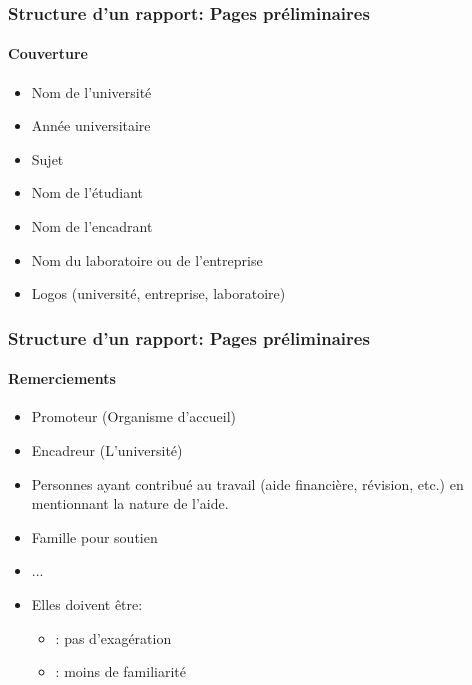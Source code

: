 \documentclass[xcolor=table]{beamer}
\begin{document}
\begin{frame}
\frametitle{Structure d'un rapport: Pages préliminaires}
\framesubtitle{Couverture}

\begin{minipage}{0.60\textwidth}
	\begin{itemize}
		\item Nom de l'université 
		\item Année universitaire
		\item Sujet
		\item Nom de l'étudiant
		\item Nom de l'encadrant 
		\item Nom du laboratoire ou de l'entreprise
		\item Logos (université, entreprise, laboratoire)
	\end{itemize}
\end{minipage}
\begin{minipage}{0.38\textwidth}
\end{minipage}

\end{frame}

\begin{frame}
\frametitle{Structure d'un rapport: Pages préliminaires}
\framesubtitle{Remerciements}

\begin{minipage}{0.60\textwidth}
	\begin{itemize}
		\item Promoteur (Organisme d'accueil)
		\item Encadreur (L'université)
		\item Personnes ayant contribué au travail (aide financière, révision, etc.) en mentionnant la nature de l'aide.
		\item Famille pour soutien
		\item ...
		\item Elles doivent être:
		\begin{itemize}
			\item {}: pas d'exagération
			\item {}: moins de familiarité
		\end{itemize}
	\end{itemize}
\end{minipage}
\begin{minipage}{0.38\textwidth}
\end{minipage}

\end{frame}
\end{document}
